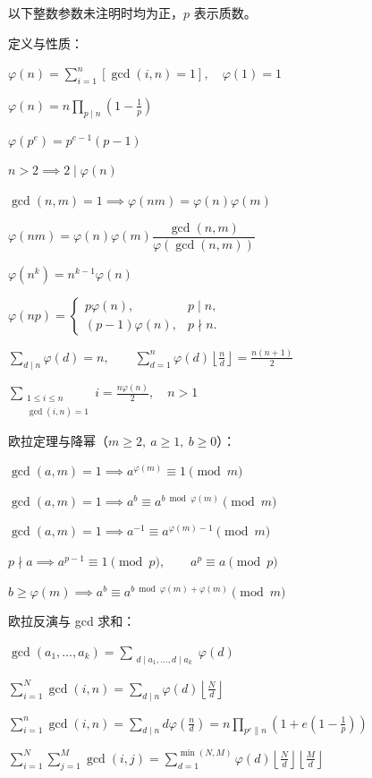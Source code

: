 以下整数参数未注明时均为正，$p$ 表示质数。

定义与性质：\nopagebreak[4]

$\varphi(n)=\displaystyle\sum_{i=1}^{n}[\gcd(i,n)=1],\quad\varphi(1)=1$

$\varphi(n)=n\displaystyle\prod_{p\mid n}\left(1-\frac1p\right)$

$\varphi(p^e)=p^{e-1}(p-1)$

$n>2\implies 2\mid\varphi(n)$

$\gcd(n,m)=1\implies\varphi(nm)=\varphi(n)\varphi(m)$

$\varphi(nm)=\varphi(n)\varphi(m)\dfrac{\gcd(n,m)}{\varphi(\gcd(n,m))}$

$\varphi(n^k)=n^{k-1}\varphi(n)$

$\varphi(np)=\begin{cases}p\varphi(n),&p\mid n,\\(p-1)\varphi(n),&p\nmid n.\end{cases}$

$\displaystyle\sum_{d\mid n}\varphi(d)=n,\qquad\sum_{d=1}^{n}\varphi(d)\left\lfloor\frac nd\right\rfloor=\frac{n(n+1)}2$

$\displaystyle\sum_{\substack{1\le i\le n\\\gcd(i,n)=1}}i=\frac{n\varphi(n)}2,\quad n>1$

欧拉定理与降幂（$m\ge2,\ a\ge1,\ b\ge0$）：\nopagebreak[4]

$\gcd(a,m)=1\implies a^{\varphi(m)}\equiv1\pmod m$

$\gcd(a,m)=1\implies a^b\equiv a^{b\bmod\varphi(m)}\pmod m$

$\gcd(a,m)=1\implies a^{-1}\equiv a^{\varphi(m)-1}\pmod m$

$p\nmid a\implies a^{p-1}\equiv1\pmod p,\qquad a^p\equiv a\pmod p$

$b\ge\varphi(m)\implies a^b\equiv a^{b\bmod\varphi(m)+\varphi(m)}\pmod m$

欧拉反演与 gcd 求和：\nopagebreak[4]

$\gcd(a_1,\dots,a_k)=\displaystyle\sum_{\substack{d\mid a_1,\dots,d\mid a_k}}\varphi(d)$

$\displaystyle\sum_{i=1}^{N}\gcd(i,n)=\sum_{d\mid n}\varphi(d)\left\lfloor\frac Nd\right\rfloor$

$\displaystyle\sum_{i=1}^{n}\gcd(i,n)=\sum_{d\mid n}d\varphi\left(\frac nd\right)=n\prod_{p^e\parallel n}\left(1+e\left(1-\frac1p\right)\right)$

$\displaystyle\sum_{i=1}^{N}\sum_{j=1}^{M}\gcd(i,j)=\sum_{d=1}^{\min(N,M)}\varphi(d)\left\lfloor\frac Nd\right\rfloor\left\lfloor\frac Md\right\rfloor$

